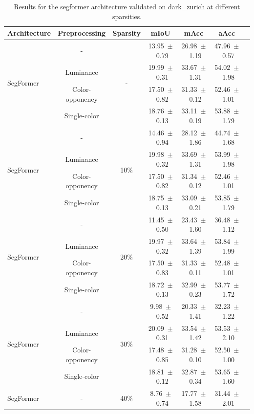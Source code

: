\begin{table}[h]
\centering
\caption{Results for the segformer architecture validated on dark_zurich at different sparsities.}
\begin{tabular}{@{}lccc ccc@{}}
\toprule
Architecture & Preprocessing & Sparsity & mIoU & mAcc & aAcc \\
\midrule

\multirow{4}{*}{SegFormer} & - & \multirow{4}{*}{-} & 13.95~$\pm$~0.79 & 26.98~$\pm$~1.19 & 47.96~$\pm$~0.57 \\
& Luminance & & 19.99~$\pm$~0.31 & 33.67~$\pm$~1.31 & 54.02~$\pm$~1.98 \\
& Color-opponency & & 17.50~$\pm$~0.82 & 31.33~$\pm$~0.12 & 52.46~$\pm$~1.01 \\
& Single-color & & 18.76~$\pm$~0.13 & 33.11~$\pm$~0.19 & 53.88~$\pm$~1.79 \\
\midrule
\multirow{4}{*}{SegFormer} & - & \multirow{4}{*}{10\%} & 14.46~$\pm$~0.94 & 28.12~$\pm$~1.86 & 44.74~$\pm$~1.68 \\
& Luminance & & 19.98~$\pm$~0.32 & 33.69~$\pm$~1.31 & 53.99~$\pm$~1.98 \\
& Color-opponency & & 17.50~$\pm$~0.82 & 31.34~$\pm$~0.12 & 52.46~$\pm$~1.01 \\
& Single-color & & 18.75~$\pm$~0.13 & 33.09~$\pm$~0.21 & 53.85~$\pm$~1.79 \\
\midrule
\multirow{4}{*}{SegFormer} & - & \multirow{4}{*}{20\%} & 11.45~$\pm$~0.50 & 23.43~$\pm$~1.60 & 36.48~$\pm$~1.12 \\
& Luminance & & 19.97~$\pm$~0.32 & 33.64~$\pm$~1.39 & 53.84~$\pm$~1.99 \\
& Color-opponency & & 17.50~$\pm$~0.83 & 31.33~$\pm$~0.11 & 52.48~$\pm$~1.01 \\
& Single-color & & 18.72~$\pm$~0.13 & 32.99~$\pm$~0.23 & 53.77~$\pm$~1.72 \\
\midrule
\multirow{4}{*}{SegFormer} & - & \multirow{4}{*}{30\%} & 9.98~$\pm$~0.52 & 20.33~$\pm$~1.41 & 32.23~$\pm$~1.22 \\
& Luminance & & 20.09~$\pm$~0.31 & 33.54~$\pm$~1.42 & 53.53~$\pm$~2.10 \\
& Color-opponency & & 17.48~$\pm$~0.85 & 31.28~$\pm$~0.10 & 52.50~$\pm$~1.00 \\
& Single-color & & 18.81~$\pm$~0.12 & 32.87~$\pm$~0.34 & 53.65~$\pm$~1.60 \\
\midrule
\multirow{4}{*}{SegFormer} & - & \multirow{4}{*}{40\%} & 8.76~$\pm$~0.74 & 17.77~$\pm$~1.58 & 31.44~$\pm$~2.01 \\

\end{tabular}
\end{table}
